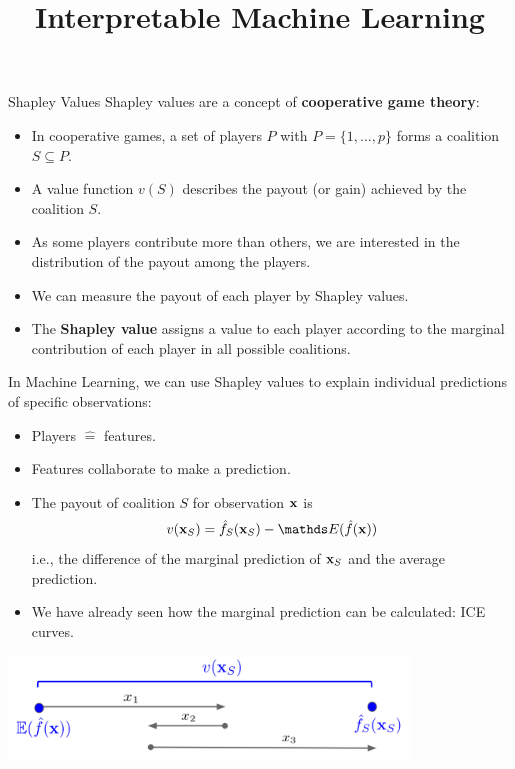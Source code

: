 \documentclass[11pt,compress,t,notes=noshow, aspectratio=169, xcolor=table]{beamer}
\title{Interpretable Machine Learning}
\date{}
\begin{document}
\newcommand{\learninggoals}{
\item Test
}

\begin{vbframe}{Shapley Values}
Shapley values are a concept of \textbf{cooperative game theory}:
\begin{itemize}
  \item In cooperative games, a set of players $P$ with $P = \{1, \hdots, p\}$ forms a coalition $S \subseteq P$.
  \item A value function $v(S)$ describes the payout (or gain) achieved by the coalition $S$.
  \item As some players contribute more than others, we are interested in the distribution of the payout among the players.
  \item We can measure the payout of each player by Shapley values.
  \item The \textbf{Shapley value} assigns a value to each player according to the marginal contribution of each player in all possible coalitions.
\end{itemize}

\framebreak
In Machine Learning, we can use Shapley values to explain individual predictions of specific observations:
\begin{itemize}
  \item Players $\hat{=}$ features.
  \item Features collaborate to make a prediction.
  \item The payout of coalition $S$ for observation $\xv$ is
  $$v(\xv_S) =  \fh_{S} (\xv_S) - \E (\fh(\xv))$$
  i.e., the difference of the marginal prediction of $\xv_S$ and the average prediction.
  \item We have already seen how the marginal prediction can be calculated: ICE curves.
\end{itemize}
\begin{center}
\vspace{-0.3cm}
\includegraphics[width=0.8\textwidth]{figure_man/shapley_valuefct}
\end{center}
\framebreak


\end{vbframe}
\end{document}
